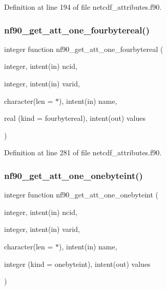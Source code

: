 Definition at line 194 of file netcdf\+\_\+attributes.\+f90.

\mbox{\label{netcdf__attributes_8f90_aea7a3824f9ca8df04723def3de3ff9c2}} 
\subsubsection{\texorpdfstring{nf90\+\_\+get\+\_\+att\+\_\+one\+\_\+fourbytereal()}{nf90\_get\_att\_one\_fourbytereal()}}
{\footnotesize\ttfamily integer function nf90\+\_\+get\+\_\+att\+\_\+one\+\_\+fourbytereal (\begin{DoxyParamCaption}\item[{integer, intent(in)}]{ncid,  }\item[{integer, intent(in)}]{varid,  }\item[{character(len = $\ast$), intent(in)}]{name,  }\item[{real (kind = fourbytereal), intent(out)}]{values }\end{DoxyParamCaption})}



Definition at line 281 of file netcdf\+\_\+attributes.\+f90.

\mbox{\label{netcdf__attributes_8f90_a81fc65e13ec42b59e050c620e7987275}} 
\subsubsection{\texorpdfstring{nf90\+\_\+get\+\_\+att\+\_\+one\+\_\+onebyteint()}{nf90\_get\_att\_one\_onebyteint()}}
{\footnotesize\ttfamily integer function nf90\+\_\+get\+\_\+att\+\_\+one\+\_\+onebyteint (\begin{DoxyParamCaption}\item[{integer, intent(in)}]{ncid,  }\item[{integer, intent(in)}]{varid,  }\item[{character(len = $\ast$), intent(in)}]{name,  }\item[{integer (kind = onebyteint), intent(out)}]{values }\end{DoxyParamCaption})}



